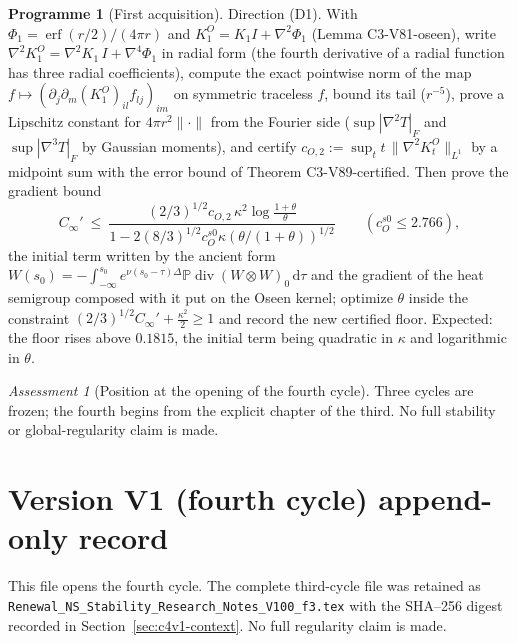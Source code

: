 \documentclass[11pt]{article}
\newcommand{\dd}{\,\mathrm d}
\newcommand{\PP}{\mathbb P}
\theoremstyle{plain}
\theoremstyle{definition}
\newtheorem{programme}[theorem]{Programme}
\theoremstyle{remark}
\newtheorem{assessment}[theorem]{Assessment}
\begin{document}
\begin{programme}[First acquisition]
\label{prog:c4v1-first}
Direction (D1).  With \(\Phi_1=\operatorname{erf}(r/2)/(4\pi r)\) and \(K^O_1=K_1I+\nabla^2\Phi_1\) (Lemma
C3-V81-oseen), write \(\nabla^2K^O_1=\nabla^2K_1\,I+\nabla^4\Phi_1\) in radial form (the
fourth derivative of a radial function has three radial
coefficients), compute the exact pointwise norm of the map
\(f\mapsto(\partial_j\partial_m(K^O_1)_{il}f_{lj})_{im}\) on symmetric traceless \(f\), bound its tail
(\(r^{-5}\)), prove a Lipschitz constant for \(4\pi r^2\|\cdot\|\) from the Fourier
side (\(\sup|\nabla^2T|_F\) and \(\sup|\nabla^3T|_F\) by Gaussian moments), and certify
\(c_{O,2}:=\sup_tt\,\|\nabla^2K^O_t\|_{L^1}\) by a midpoint sum with the error bound of
Theorem C3-V89-certified.  Then prove the gradient bound
\[
 C_\infty'\ \le\ \frac{(2/3)^{1/2}c_{O,2}\,\kappa^2\log\frac{1+\theta}\theta}{1-2(8/3)^{1/2}c_O^{s0}\kappa(\theta/(1+\theta))^{1/2}}
 \qquad(c_O^{s0}\le2.766),
\]
the initial term written by the ancient form
\(W(s_0)=-\int_{-\infty}^{s_0}e^{\nu(s_0-\tau)\Delta}\PP\operatorname{div}(W\otimes W)_0\dd\tau\) and the gradient of the
heat semigroup composed with it put on the Oseen kernel; optimize
\(\theta\) inside the constraint \((2/3)^{1/2}C_\infty'+\frac{\kappa^2}2\ge1\) and record the new
certified floor.  Expected: the floor rises above \(0.1815\), the
initial term being quadratic in \(\kappa\) and logarithmic in \(\theta\).
\end{programme}

\begin{assessment}[Position at the opening of the fourth cycle]
\label{ass:c4v1-position}
Three cycles are frozen; the fourth begins from the explicit chapter
of the third.  No full stability or global-regularity claim is made.
\end{assessment}

\section*{Version V1 (fourth cycle) append-only record}

This file opens the fourth cycle.  The complete third-cycle file was
retained as \texttt{Renewal\_NS\_Stability\_Research\_Notes\_V100\_f3.tex}
with the SHA--256 digest recorded in Section~\ref{sec:c4v1-context}.
No full regularity claim is made.
\end{document}
